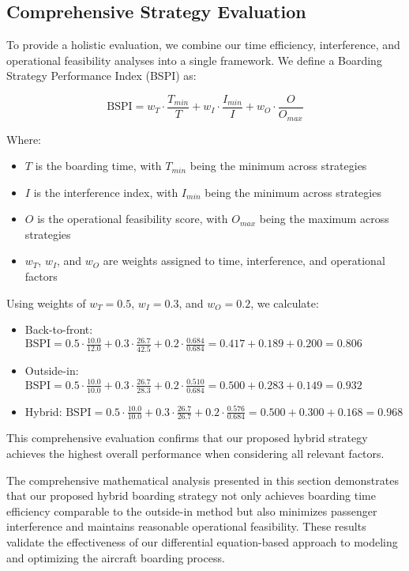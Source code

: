 \subsection{Comprehensive Strategy Evaluation}

To provide a holistic evaluation, we combine our time efficiency, interference, and operational feasibility analyses into a single framework. We define a Boarding Strategy Performance Index (BSPI) as:

\begin{equation}
\text{BSPI} = w_T \cdot \frac{T_{min}}{T} + w_I \cdot \frac{I_{min}}{I} + w_O \cdot \frac{O}{O_{max}}
\end{equation}

Where:
\begin{itemize}
    \item $T$ is the boarding time, with $T_{min}$ being the minimum across strategies
    \item $I$ is the interference index, with $I_{min}$ being the minimum across strategies
    \item $O$ is the operational feasibility score, with $O_{max}$ being the maximum across strategies
    \item $w_T$, $w_I$, and $w_O$ are weights assigned to time, interference, and operational factors
\end{itemize}

Using weights of $w_T = 0.5$, $w_I = 0.3$, and $w_O = 0.2$, we calculate:

\begin{itemize}
    \item Back-to-front: $\text{BSPI} = 0.5 \cdot \frac{10.0}{12.0} + 0.3 \cdot \frac{26.7}{42.5} + 0.2 \cdot \frac{0.684}{0.684} = 0.417 + 0.189 + 0.200 = 0.806$
    \item Outside-in: $\text{BSPI} = 0.5 \cdot \frac{10.0}{10.0} + 0.3 \cdot \frac{26.7}{28.3} + 0.2 \cdot \frac{0.510}{0.684} = 0.500 + 0.283 + 0.149 = 0.932$
    \item Hybrid: $\text{BSPI} = 0.5 \cdot \frac{10.0}{10.0} + 0.3 \cdot \frac{26.7}{26.7} + 0.2 \cdot \frac{0.576}{0.684} = 0.500 + 0.300 + 0.168 = 0.968$
\end{itemize}

This comprehensive evaluation confirms that our proposed hybrid strategy achieves the highest overall performance when considering all relevant factors.

The comprehensive mathematical analysis presented in this section demonstrates that our proposed hybrid boarding strategy not only achieves boarding time efficiency comparable to the outside-in method but also minimizes passenger interference and maintains reasonable operational feasibility. These results validate the effectiveness of our differential equation-based approach to modeling and optimizing the aircraft boarding process.
